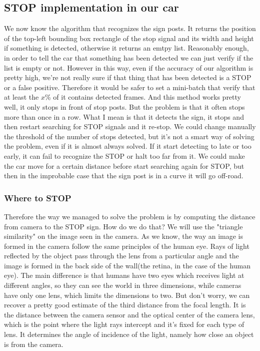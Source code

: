 \documentclass[12pt,a4paper]{article}
\begin{document}
\begin{large}
\subsection{STOP implementation in our car}
We now know the algorithm that recognizes the sign posts. It returns the position of the top-left bounding box rectangle of the stop signal and its width and height if something is detected, otherwise it returns an emtpy list. Reasonably enough, in order to tell the car that something has been detected we can just verify if the list is empty or not. However in this way, even if the accuracy of our algorithm is pretty high, we're not really sure if that thing that has been detected is a STOP or a false positive. Therefore it would be safer to set a mini-batch that verify that at least the $x$\% of it contains detected frames. And this method works pretty well, it only stops in front of stop posts. But the problem is that it often stops more than once in a row. What I mean is that it detects the sign, it stops and then restart searching for STOP signals and it re-stop. We could change manually the threshold of the number of stops detected, but it's not a smart way of solving the problem, even if it is almost always solved. If it start detecting to late or too early, it can fail to recognize the STOP or halt too far from it. We could make the car move for a certain distance before start searching again for STOP, but then in the improbable case that the sign post is in a curve it will go off-road.
\subsubsection*{Where to STOP}
Therefore the way we managed to solve the problem is by computing the distance from camera to the STOP sign. How do we do that? We will use the "triangle similarity" on the image seen in the camera. As we know, the way an image is formed in the camera follow the same principles of the human eye. Rays of light reflected by the object pass through the lens  from a particular angle and the image is formed in the back side of the wall(the retina, in the case of the human eye). The main difference is that humans have two eyes which receives light at different angles, so they can see the world in three dimensions, while cameras have only one lens, which limits the dimensions to two. But don't worry, we can recover a pretty good estimate of the third distance from the focal length. It is the distance between the camera sensor and the optical center of the camera lens, which is the point where the light rays intercept and it's fixed for each type of lens. It determines the angle of incidence of the light, namely how close an object is from the camera.


\end{large}
\end{document}
